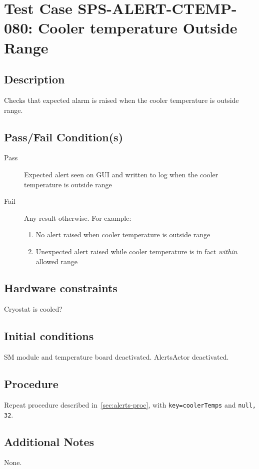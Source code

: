 \section{Test Case SPS-ALERT-CTEMP-080: Cooler temperature Outside Range}

\subsection{Description}

Checks that expected alarm is raised when the cooler temperature is outside range.

\subsection{Pass/Fail Condition(s)}

\begin{description}
\item [Pass] Expected alert seen on GUI and written to log when the cooler temperature is outside range
\item [Fail] Any result otherwise. For example:

\begin{enumerate}
    \item No alert raised when cooler temperature is outside range
    \item Unexpected alert raised while cooler temperature is in fact {\it within} allowed range
\end{enumerate}
\end{description}

\subsection{Hardware constraints}

Cryostat is cooled?

\subsection{Initial conditions}

SM module and temperature board deactivated. AlertsActor deactivated.

\subsection{Procedure}

Repeat procedure described in~\ref{sec:alerts-proc}, with \texttt{key=coolerTemps} and \texttt{null, 32}.

\subsection{Additional Notes}
None.
